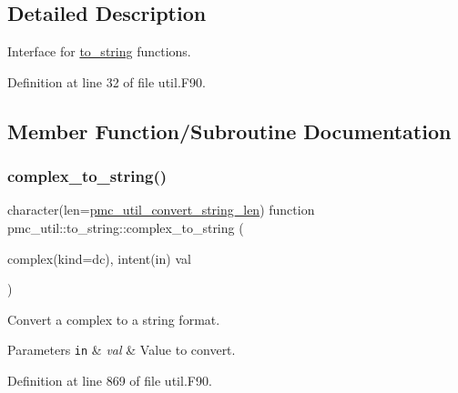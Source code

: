 \subsection{Detailed Description}
Interface for \mbox{\hyperlink{interfacepmc__util_1_1to__string}{to\+\_\+string}} functions. 

Definition at line 32 of file util.\+F90.



\subsection{Member Function/\+Subroutine Documentation}
\mbox{\label{interfacepmc__util_1_1to__string_a114a44c00d9577503d304028962b77a1}} 
\subsubsection{\texorpdfstring{complex\+\_\+to\+\_\+string()}{complex\_to\_string()}}
{\footnotesize\ttfamily character(len=\mbox{\hyperlink{namespacepmc__util_afd468d26aef28509c08087ba8e59089a}{pmc\+\_\+util\+\_\+convert\+\_\+string\+\_\+len}}) function pmc\+\_\+util\+::to\+\_\+string\+::complex\+\_\+to\+\_\+string (\begin{DoxyParamCaption}\item[{complex(kind=dc), intent(in)}]{val }\end{DoxyParamCaption})}



Convert a complex to a string format. 


\begin{DoxyParams}[1]{Parameters}
\mbox{\tt in}  & {\em val} & Value to convert. \\
\hline
\end{DoxyParams}


Definition at line 869 of file util.\+F90.

\mbox{\label{interfacepmc__util_1_1to__string_af83a2ce0f1a189f0d5027b423f111825}} 

